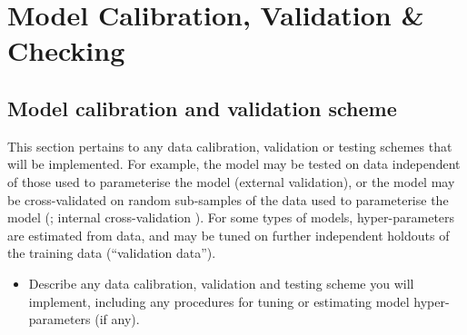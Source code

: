 \documentclass[
]{article}
\providecommand{\tightlist}{%
  \setlength{\itemsep}{0pt}\setlength{\parskip}{0pt}}
\begin{document}
\section{Model Calibration, Validation \&
Checking}\label{model-calibration-validation-checking}

\subsection{Model calibration and validation
scheme}\label{model-calibration-and-validation-scheme}

\begin{tcolorbox}[enhanced jigsaw, opacitybacktitle=0.6, bottomrule=.15mm, leftrule=.75mm, rightrule=.15mm, colbacktitle=quarto-callout-note-color!10!white, toprule=.15mm, titlerule=0mm, left=2mm, colframe=quarto-callout-note-color-frame, breakable, title=\textcolor{quarto-callout-note-color}{\faInfo}\hspace{0.5em}{Explanation}, opacityback=0, coltitle=black, bottomtitle=1mm, colback=white, toptitle=1mm, arc=.35mm]

This section pertains to any data calibration, validation or testing
schemes that will be implemented. For example, the model may be tested
on data independent of those used to parameterise the model (external
validation), or the model may be cross-validated on random sub-samples
of the data used to parameterise the model
(; internal
cross-validation ). For some
types of models, hyper-parameters are estimated from data, and may be
tuned on further independent holdouts of the training data (``validation
data'').

\end{tcolorbox}

\begin{tcolorbox}[enhanced jigsaw, opacitybacktitle=0.6, bottomrule=.15mm, leftrule=.75mm, rightrule=.15mm, colbacktitle=quarto-callout-caution-color!10!white, toprule=.15mm, titlerule=0mm, left=2mm, colframe=quarto-callout-caution-color-frame, breakable, title=\textcolor{quarto-callout-caution-color}{\faFire}\hspace{0.5em}{Preregistration Item}, opacityback=0, coltitle=black, bottomtitle=1mm, colback=white, toptitle=1mm, arc=.35mm]

\begin{itemize}
\tightlist
\item[$\square$]
  Describe any data calibration, validation and testing scheme you will
  implement, including any procedures for tuning or estimating model
  hyper-parameters (if any).
\end{itemize}

\end{tcolorbox}
\end{document}
